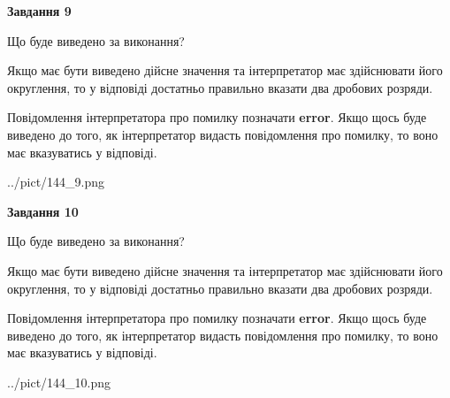 \documentclass[12pt, ukrainian]{article}
\begin{document}
{\begin {Large}
{\begin {center}\textbf{Завдання 9}\end {center}}\par
Що буде виведено за виконання? \par

Якщо має бути виведено дійсне значення та інтерпретатор має здійснювати його округлення, 
то у відповіді достатньо правильно вказати два дробових розряди.

Повідомлення інтерпретатора про помилку позначати \textbf{error}.
Якщо щось буде виведено до того, як інтерпретатор видасть повідомлення про помилку, 
то воно має вказуватись у відповіді. \par

\begin{center}
	{../pict/144_9.png}
\end{center}
\newpage

{\begin {center}\textbf{Завдання 10}\end {center}}\par
Що буде виведено за виконання? \par

Якщо має бути виведено дійсне значення та інтерпретатор має здійснювати його округлення, 
то у відповіді достатньо правильно вказати два дробових розряди.

Повідомлення інтерпретатора про помилку позначати \textbf{error}.
Якщо щось буде виведено до того, як інтерпретатор видасть повідомлення про помилку, 
то воно має вказуватись у відповіді. \par

\begin{center}
	{../pict/144_10.png}
\end{center}
\newpage

\end {Large}}
\end{document}
